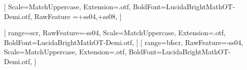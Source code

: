     [%
    	  Scale=MatchUppercase,
    	  Extension=.otf,
    	  BoldFont=LucidaBrightMathOT-Demi.otf,
    	  RawFeature ={+ss04,+ss08}, %
    ]
 
% 
    [%
    	  range={scr},%
    	  RawFeature={-ss04},
    	  Scale=MatchUppercase,
          Extension=.otf,
    	  BoldFont=LucidaBrightMathOT-Demi.otf,%
    ]
    [%
    	  range={bfscr},%
    	  RawFeature={-ss04},
    	  Scale=MatchUppercase,
          Extension=.otf,
    	  BoldFont=LucidaBrightMathOT-Demi.otf,
    ]
    \setoperatorfont\symup
    
